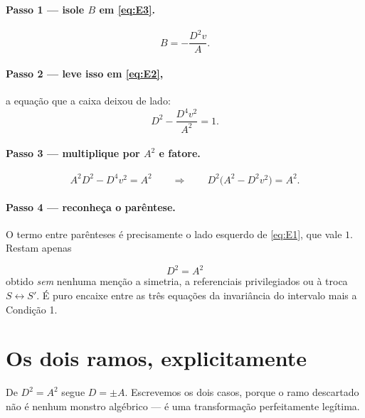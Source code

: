 \documentclass[12pt,a4paper,oneside]{book}
\begin{document}
\paragraph{Passo 1 --- isole $B$ em \eqref{eq:E3}.}
\begin{equation}
  B = -\frac{D^2 v}{A}.
\end{equation}

\paragraph{Passo 2 --- leve isso em \eqref{eq:E2},} a equação que a caixa
deixou de lado:
\begin{equation}
  D^2 - \frac{D^4v^2}{A^2} = 1 .
\end{equation}

\paragraph{Passo 3 --- multiplique por $A^2$ e fatore.}
\begin{equation}
  A^2D^2 - D^4v^2 = A^2
  \qquad\Longrightarrow\qquad
  D^2\bigl(A^2 - D^2v^2\bigr) = A^2 .
\end{equation}

\paragraph{Passo 4 --- reconheça o parêntese.}
O termo entre parênteses é precisamente o lado esquerdo de \eqref{eq:E1},
que vale $1$. Restam apenas

\begin{central}
\begin{equation}
  \boxed{\;D^2 = A^2\;}
\end{equation}
obtido \emph{sem} nenhuma menção a simetria, a referenciais privilegiados ou
à troca $S\leftrightarrow S'$. É puro encaixe entre as três equações da
invariância do intervalo mais a Condição 1.
\end{central}

\section{Os dois ramos, explicitamente}

De $D^2=A^2$ segue $D=\pm A$. Escrevemos os dois casos, porque o ramo
descartado não é nenhum monstro algébrico --- é uma transformação
perfeitamente legítima.
\end{document}
